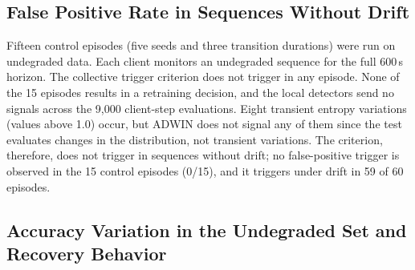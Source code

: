 \documentclass[conference]{IEEEtran}
\begin{document}
\subsection{False Positive Rate in Sequences Without Drift}
Fifteen control episodes (five seeds and three transition durations) were run on undegraded data. Each client monitors an undegraded sequence for the full 600\,s horizon. The collective trigger criterion does not trigger in any episode. None of the 15 episodes results in a retraining decision, and the local detectors send no signals across the 9,000 client-step evaluations. Eight transient entropy variations (values above 1.0) occur, but ADWIN does not signal any of them since the test evaluates changes in the distribution, not transient variations. The criterion, therefore, does not trigger in sequences without drift; no false-positive trigger is observed in the 15 control episodes (0/15), and it triggers under drift in 59 of 60 episodes.

\subsection{Accuracy Variation in the Undegraded Set and Recovery Behavior}
\begin{table}[!t]
\centering
\caption{Accuracy variation in the undegraded set $\Delta$ (ReacQD; group mean $\pm$ standard deviation across 5 seeds).}
\label{tab:retention}
\end{table}
\end{document}
